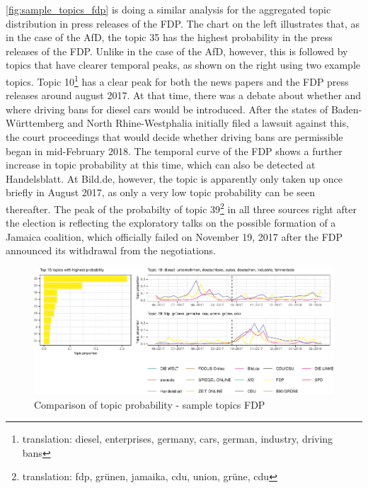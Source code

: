 \documentclass[
]{article}
\begin{document}
\autoref{fig:sample_topics_fdp} is doing a similar analysis for the
aggregated topic distribution in press releases of the FDP. The chart on
the left illustrates that, as in the case of the AfD, the topic 35 has
the highest probability in the press releases of the FDP. Unlike in the
case of the AfD, however, this is followed by topics that have clearer
temporal peaks, as shown on the right using two example topics. Topic
10\footnote{translation: diesel, enterprises, germany, cars, german,
  industry, driving bans} has a clear peak for both the news papers and
the FDP press releases around august 2017. At that time, there was a
debate about whether and where driving bans for diesel cars would be
introduced. After the states of Baden-Württemberg and North
Rhine-Westphalia initially filed a lawsuit against this, the court
proceedings that would decide whether driving bans are permissible began
in mid-February 2018. The temporal curve of the FDP shows a further
increase in topic probability at this time, which can also be detected
at Handelsblatt. At Bild.de, however, the topic is apparently only taken
up once briefly in August 2017, as only a very low topic probability can
be seen thereafter. The peak of the probabilty of topic 39\footnote{translation:
  fdp, grünen, jamaika, cdu, union, grüne, cdu} in all three sources
right after the election is reflecting the exploratory talks on the
possible formation of a Jamaica coalition, which officially failed on
November 19, 2017 after the FDP announced its withdrawal from the
negotiations.

\begin{figure}

{\centering \includegraphics[width=1\linewidth]{main_text_files/figure-latex/Top FDP topics-1} 

}

\caption{Comparison of topic probability - sample topics FDP \label{fig:sample_topics_fdp}}\label{fig:Top FDP topics}
\end{figure}
\end{document}
